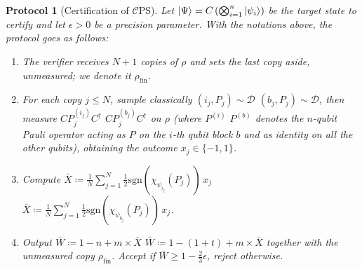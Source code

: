 \documentclass[a4paper,twocolumn,11pt,unpublished]{../../revision/quantumarticle}
\newtheorem{protocol}{Protocol}
\newcommand{\np}{m}
\newcommand{\CEPS}{$\mathcal C$PS}
\newcommand{\pdist}{\mathcal D} %
\newcommand{\copyindex}{j}
\newcommand{\qubit}{i}
\providecommand{\DIFadd}[1]{{\protect\color{blue} \sf #1}} %
\providecommand{\DIFdel}[1]{{\protect\color{red} \scriptsize #1}} %
\providecommand{\DIFaddbegin}{} %
\providecommand{\DIFaddend}{} %
\providecommand{\DIFdelbegin}{} %
\providecommand{\DIFdelend}{} %
\begin{document}
        \begin{protocol}[Certification of \CEPS]
            \label{protocol:certification}
            Let $\ket\Psi = C\left(\bigotimes_{\qubit=1}^n\ket{\psi_\qubit}\right)$ be the target state to certify and let $\epsilon>0$ be a precision parameter. With the notations above, the protocol goes as follows:
            \begin{enumerate}
                \item The verifier receives $N+1$ copies of $\rho$ and sets the last copy aside, unmeasured; we denote it $\rho_{\mathrm{fin}}$.
                \item For each copy $\copyindex\leq N$, sample classically \DIFdelbegin \DIFdel{$(\qubit_j, P_j)\sim \pdist$}\DIFdelend \DIFaddbegin \DIFadd{$(b_j, P_j)\sim \pdist$}\DIFaddend , then measure \DIFdelbegin \DIFdel{$C P_j^{(i_j)} C^\dagger$ }\DIFdelend \DIFaddbegin \DIFadd{$C P_j^{(b_j)} C^\dagger$ }\DIFaddend on $\rho$ (where \DIFdelbegin \DIFdel{$P^{(i)}$ }\DIFdelend \DIFaddbegin \DIFadd{$P^{(b)}$ }\DIFaddend denotes the $n$-qubit Pauli operator acting as $P$ on \DIFdelbegin \DIFdel{the $i$-th qubit }\DIFdelend \DIFaddbegin \DIFadd{block $b$ }\DIFaddend and as identity on all the other qubits), obtaining the outcome $x_j\in\{-1, 1\}$.
                \item Compute \DIFdelbegin \DIFdel{$\bar X \coloneqq \frac{1}{N}\sum_{\copyindex=1}^N \tfrac 1 2 \mathrm{sgn}(\chi_{\psi_{\qubit_j}}(P_j)) \,x_j$}\DIFdelend \DIFaddbegin \DIFadd{$\bar X \coloneqq \frac{1}{N}\sum_{\copyindex=1}^N \tfrac 1 2 \mathrm{sgn}(\chi_{\psi_{b_j}}(P_j)) \,x_j$}\DIFaddend .
                \item Output \DIFdelbegin \DIFdel{$\bar W\coloneqq 1-n+\np\times \bar X$ }\DIFdelend \DIFaddbegin \DIFadd{$\bar W\coloneqq 1-(1+t)+\np\times \bar X$ }\DIFaddend together with the unmeasured copy $\rho_{\mathrm{fin}}$. Accept if $\bar W\ge1-\frac{2}{3}\epsilon$, reject otherwise.
            \end{enumerate}
        \end{protocol}
\end{document}
